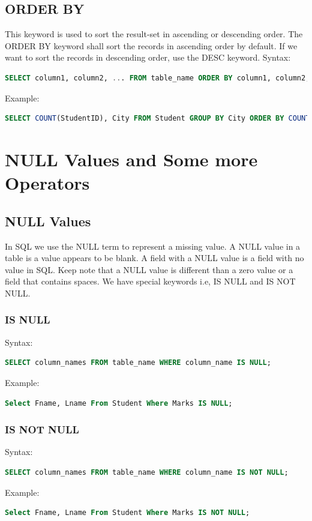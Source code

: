 \section{ORDER BY}
This keyword is used to sort the result-set in ascending or descending order. The ORDER BY keyword shall sort the records in ascending order by default. If we want to sort the records in descending order, use the DESC keyword.
Syntax:
\begin{lstlisting}[language=sql]
	SELECT column1, column2, ... FROM table_name ORDER BY column1, column2, ... ASC|DESC;
\end{lstlisting}
Example:
\begin{lstlisting}[language=sql]
	SELECT COUNT(StudentID), City FROM Student GROUP BY City ORDER BY COUNT(StudentID) DESC;
\end{lstlisting}

\chapter{NULL Values and Some more Operators}

\section{NULL Values}
In SQL we use the NULL term to represent a missing value. A NULL value in a table is a value appears to be blank. A field with a NULL value is a field with no value in SQL. Keep note that a NULL value is different than a zero value or a field that contains spaces. We have special keywords i.e, IS NULL and IS NOT NULL.

\subsection{IS NULL}
Syntax:
\begin{lstlisting}[language=sql]
	SELECT column_names FROM table_name WHERE column_name IS NULL;
\end{lstlisting}
Example:
\begin{lstlisting}[language=sql]
	Select Fname, Lname From Student Where Marks IS NULL;
\end{lstlisting}

\subsection{IS NOT NULL}
Syntax:
\begin{lstlisting}[language=sql]
	SELECT column_names FROM table_name WHERE column_name IS NOT NULL;
\end{lstlisting}
Example:
\begin{lstlisting}[language=sql]
	Select Fname, Lname From Student Where Marks IS NOT NULL;
\end{lstlisting}


